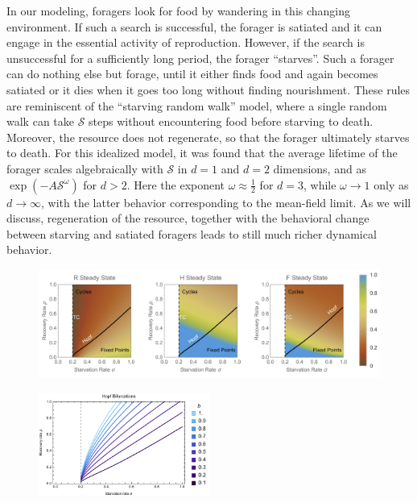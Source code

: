 \documentclass[12pt,english]{article}
\begin{document}
\begin{spacing}{1.9}
In our modeling, foragers look for food by wandering in this changing
environment.  If such a search is successful, the forager is satiated and it
can engage in the essential activity of reproduction.  However, if the search
is unsuccessful for a sufficiently long period, the forager ``starves''.
Such a forager can do nothing else but forage, until it either finds food and
again becomes satiated or it dies when it goes too long without finding
nourishment.  These rules are reminiscent of the ``starving random walk''
model, where a single random walk can take $\mathcal{S}$ steps without
encountering food before starving to death.  Moreover, the resource does not
regenerate, so that the forager ultimately starves to death.  For this
idealized model, it was found that the average lifetime of the forager scales
algebraically with $\mathcal{S}$ in $d\!=\!1$ and $d\!=\!2$ dimensions, and
as $\exp(-A\mathcal{S}^\omega)$ for $d>2$.  Here the exponent
$\omega\approx \frac{1}{2}$ for $d=3$, while $\omega\to 1$ only as
$d\to \infty$, with the latter behavior corresponding to the mean-field
limit.  As we will discuss, regeneration of the resource, together with the
behavioral change between starving and satiated foragers leads to still much
richer dynamical behavior.



%
\newpage

 \begin{figure}[h]
 	\centering
 	\includegraphics[width=1\textwidth]{fig_HopfFP.jpg}
 	\caption{
 	}
 	\label{Hopfb}
 \end{figure}


 \begin{figure}[h]
 	\centering
 	\includegraphics[width=0.5\textwidth]{fig_HopfPlotb.pdf}
 	\caption{
 	}
 	\label{Hopfb}
 \end{figure}
 

\end{spacing}
\end{document}
